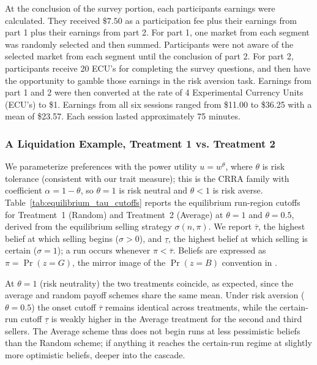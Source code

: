 \documentclass[11pt]{article}
\begin{document}
At the conclusion of the survey portion, each participants earnings were calculated. They received $\$7.50$ as a participation fee plus their earnings from part 1 plus their earnings from part 2. For part 1, one market from each segment was randomly selected and then summed. Participants were not aware of the selected market from each segment until the conclusion of part 2. For part 2, participants receive 20 ECU's for completing the survey questions, and then have the opportunity to gamble those earnings in the risk aversion task. Earnings from part 1 and 2 were then converted at the rate of 4 Experimental Currency Units (ECU's) to \$1. Earnings from all six sessions ranged from \$11.00 to \$36.25 with a mean of \$23.57. Each session lasted approximately 75 minutes.

\begin{table}[H]
  \centering
  \caption{Pre-randomized experimental parameters by segment}
  \label{tab:randomized_params}
  
\end{table}



\subsubsection{A Liquidation Example, Treatment 1 vs. Treatment 2}

\vspace{1in}

We parameterize preferences with the power utility $u = w^{\theta}$, where $\theta$ is risk tolerance (consistent with our trait measure); this is the CRRA family with coefficient $\alpha = 1 - \theta$, so $\theta = 1$ is risk neutral and $\theta < 1$ is risk averse. Table~\ref{tab:equilibrium_tau_cutoffs} reports the equilibrium run-region cutoffs for Treatment~1 (Random) and Treatment~2 (Average) at $\theta = 1$ and $\theta = 0.5$, derived from the equilibrium selling strategy $\sigma(n, \pi)$. We report $\overline{\tau}$, the highest belief at which selling begins ($\sigma > 0$), and $\underline{\tau}$, the highest belief at which selling is certain ($\sigma = 1$); a run occurs whenever $\pi < \overline{\tau}$. Beliefs are expressed as $\pi = \Pr(z = G)$, the mirror image of the $\Pr(z = B)$ convention in \cite{magnani2020dynamic}.

At $\theta = 1$ (risk neutrality) the two treatments coincide, as expected, since the average and random payoff schemes share the same mean. Under risk aversion ($\theta = 0.5$) the onset cutoff $\overline{\tau}$ remains identical across treatments, while the certain-run cutoff $\underline{\tau}$ is weakly higher in the Average treatment for the second and third sellers. The Average scheme thus does not begin runs at less pessimistic beliefs than the Random scheme; if anything it reaches the certain-run regime at slightly more optimistic beliefs, deeper into the cascade.
\end{document}
